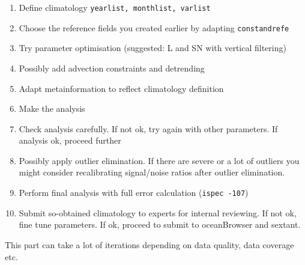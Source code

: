 \documentclass[8pt,a4paper,notitlepage]{book}
\begin{document}
\begin{enumerate}
\item Define climatology {\tt yearlist, monthlist, varlist}
\item Choose the reference fields you created earlier by adapting {\tt constandrefe}
\item Try parameter optimisation (suggested: L and SN with vertical filtering)
\item Possibly add advection constraints and detrending
\item Adapt metainformation to reflect climatology definition
\item Make the analysis
\item Check analysis carefully. If not ok, try again with other parameters. If analysis ok, proceed further
\item Possibly apply outlier elimination. If there are severe or a lot of outliers you might consider recalibrating signal/noise ratios after outlier elimination.
\item Perform final analysis with full error calculation ({\tt ispec -107})
\item Submit so-obtained climatology to experts for internal reviewing. If not ok, fine tune parameters. If ok, proceed to submit to oceanBrowser and sextant.
\end{enumerate}


This part can take a lot of iterations depending on data quality, data coverage etc.








\end{document}
